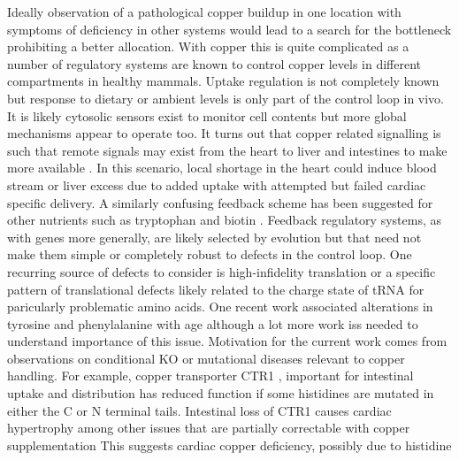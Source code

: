{Ideally observation of a pathological copper 
buildup in one location with symptoms of deficiency
in other systems would lead to a search for 
the bottleneck prohibiting a better allocation.
With copper this is quite complicated as 
a number of regulatory systems are known to control
copper levels in different compartments  in healthy mammals.
Uptake regulation is not completely known but response to
dietary or ambient levels is only part of the control
loop in vivo. It is  likely cytosolic sensors exist \cite{PMC6365104}
to monitor cell contents but more global mechanisms appear to 
operate too.
It turns out that copper related signalling is such that remote 
signals may exist from the heart
to liver and intestines to make more available
\cite{Kim_Turski_Nose_Cardiac_Copper_Deficiency_Activates_2010}
\cite{xxx_Mechanism_regulation_2010}. In this scenario, local
shortage in the heart could induce blood stream or liver excess 
due to added
uptake with attempted but failed   cardiac specific delivery.
A similarly confusing  feedback scheme 
has been suggested for other nutrients such as tryptophan
\cite{mmarchywka-MJM-2021-007-.1-table-rg}
and biotin
\cite{marchywka-MJM-2022-010-0.80}
\cite{marchywka-MJM-2021-015-0.50-rg}
.  Feedback  regulatory systems, as with genes more generally,  are likely 
selected by evolution but that need not make them simple
or  completely robust to defects in the control loop.
One recurring source of defects to consider is  high-infidelity
translation or a specific pattern of translational defects likely related
to the charge state of tRNA for paricularly problematic
amino acids.  
One recent work associated alterations in tyrosine and phenylalanine with age
\cite{PMC12142579}  although a lot more work iss needed to understand importance of this issue. 
Motivation for the current work comes from observations on
conditional KO or mutational diseases relevant to copper handling. 
For example, copper transporter CTR1 , important for
intestinal uptake  
\cite{Nose_Kim_Thiele_Ctr1_drives_intestinal_copper_2006}
and distribution  
\cite{Lee_Prohaska_Thiele_Essential_role_mammalian_2001}
\cite{PMC9759326}
\cite{PMC34439}
has  reduced function  if some
histidines are mutated in either the C or N terminal tails. 
Intestinal loss of CTR1 causes cardiac hypertrophy
among other issues that are partially correctable with copper supplementation
\cite{Nose_Kim_Thiele_Ctr1_drives_intestinal_copper_2006}
This suggests cardiac copper deficiency, possibly due to histidine 
}
